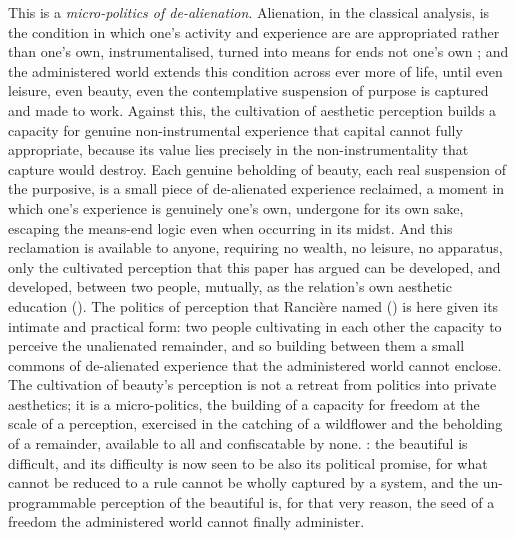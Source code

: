 This is a \emph{micro-politics of de-alienation}. Alienation, in the classical analysis, is the condition in which one's activity and experience are are appropriated rather than one's own, instrumentalised, turned into means for ends not one's own \parencite{marx1992}; and the administered world extends this condition across ever more of life, until even leisure, even beauty, even the contemplative suspension of purpose is captured and made to work. Against this, the cultivation of aesthetic perception builds a capacity for genuine non-instrumental experience that capital cannot fully appropriate, because its value lies precisely in the non-instrumentality that capture would destroy. Each genuine beholding of beauty, each real suspension of the purposive, is a small piece of de-alienated experience reclaimed, a moment in which one's experience is genuinely one's own, undergone for its own sake, escaping the means-end logic even when occurring in its midst. And this reclamation is available to anyone, requiring no wealth, no leisure, no apparatus, only the cultivated perception that this paper has argued can be developed, and developed, between two people, mutually, as the relation's own aesthetic education (). The politics of perception that Rancière named () is here given its intimate and practical form: two people cultivating in each other the capacity to perceive the unalienated remainder, and so building between them a small commons of de-alienated experience that the administered world cannot enclose. The cultivation of beauty's perception is not a retreat from politics into private aesthetics; it is a micro-politics, the building of a capacity for freedom at the scale of a perception, exercised in the catching of a wildflower and the beholding of a remainder, available to all and confiscatable by none. : the beautiful is difficult, and its difficulty is now seen to be also its political promise, for what cannot be reduced to a rule cannot be wholly captured by a system, and the un-programmable perception of the beautiful is, for that very reason, the seed of a freedom the administered world cannot finally administer.

